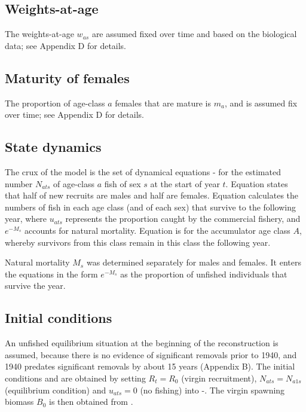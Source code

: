 \subsection{Weights-at-age}

The weights-at-age $w_{as}$ are assumed fixed over time and based on the biological data; see Appendix D for details.

\subsection{Maturity of females}

The proportion of age-class $a$ females that are mature is $m_a$, and is assumed fix over time; see Appendix D for details.

\subsection{State dynamics}

The crux of the model is the set of dynamical equations - for the estimated number $N_{ats}$ of age-class $a$ fish of sex $s$ at the start of year $t$. Equation  states that half of new recruits are males and half are females. Equation  calculates the numbers of fish in each age class (and of each sex) that survive to the following year, where $u_{ats}$ represents the proportion caught by the commercial fishery, and $e^{-M_s}$ accounts for natural mortality. Equation  is for the accumulator age class $A$, whereby survivors from this class remain in this class the following year.

Natural mortality $M_s$ was determined separately for males and females. It enters the equations in the form $e^{-M_s}$ as the proportion of unfished individuals that survive the year.

\subsection{Initial conditions}

An unfished equilibrium situation at the beginning of the reconstruction is assumed, because there is no evidence of significant removals prior to 1940, and 1940 predates significant removals by about 15 years (Appendix B). The initial conditions  and  are obtained by setting $R_t = R_0$ (virgin recruitment), $N_{ats} = N_{a1s}$ (equilibrium condition) and $u_{ats} = 0$ (no fishing) into -. The virgin spawning biomass $B_0$ is then obtained from . 

